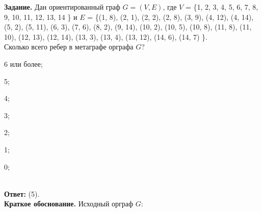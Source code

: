 \documentclass{article}
\begin{document}
\pagestyle{empty}


\noindent\textbf{Задание.} Дан ориентированный граф $G = (V, E)$, где
$V$ = \{1, 2, 3, 4, 5, 6, 7, 8, 9, 10, 11, 12, 13, 14 \} и $E$ = \{(1, 8), (2, 1), (2, 2), (2, 8), (3, 9), (4, 12), (4, 14), (5, 2), (5, 11), (6, 3), (7, 6), (8, 2), (9, 14), (10, 2), (10, 5), (10, 8), (11, 8), (11, 10), (12, 13), (12, 14), (13, 3), (13, 4), (13, 12), (14, 6), (14, 7) \}.\\
Сколько всего ребер в метаграфе орграфа $G$?
\vspace{2mm}

\noindent\begin{inparaenum}[(1)]
\item 6 или более;
 \item 5; \item 4; \item 3; \item 2; \item 1; \item 0;\end{inparaenum}\\



\noindent\textbf{Ответ:} (5).\\


\noindent\textbf{Краткое обоснование.} Исходный орграф $G$:
\vspace{8mm}
\end{document}

